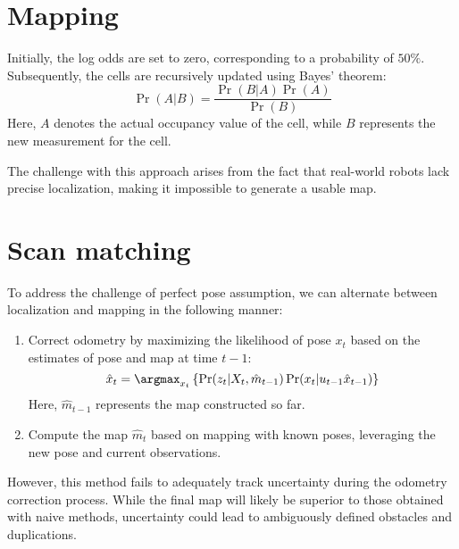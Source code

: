 \section{Mapping}

Initially, the log odds are set to zero, corresponding to a probability of $50\%$. 
Subsequently, the cells are recursively updated using Bayes' theorem:
\[\Pr(A|B)=\dfrac{\Pr(B|A)\Pr(A)}{\Pr(B)}\]
Here, $A$ denotes the actual occupancy value of the cell, while $B$ represents the new measurement for the cell.

The challenge with this approach arises from the fact that real-world robots lack precise localization, making it impossible to generate a usable map.

\section{Scan matching}
To address the challenge of perfect pose assumption, we can alternate between localization and mapping in the following manner:
\begin{enumerate}
    \item Correct odometry by maximizing the likelihood of pose $x_t$ based on the estimates of pose and map at time $t-1$: 
        \[\hat{x}_t=\argmax_{x_t}\left\{\Pr(z_t|X_t,\hat{m}_{t-1})\Pr(x_t|u_{t-1}\hat{x}_{t-1})\right\}\]
        Here, $\hat{m}_{t-1}$ represents the map constructed so far.
    \item Compute the map $\hat{m}_{t}$ based on mapping with known poses, leveraging the new pose and current observations.
\end{enumerate}

However, this method fails to adequately track uncertainty during the odometry correction process.
While the final map will likely be superior to those obtained with naive methods, uncertainty could lead to ambiguously defined obstacles and duplications.